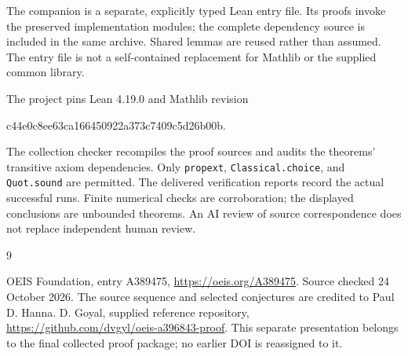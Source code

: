 \documentclass[11pt,a4paper]{article}
\theoremstyle{remark}
\begin{document}
The companion is a separate, explicitly typed Lean entry file. Its proofs
invoke the preserved implementation modules; the complete dependency source
is included in the same archive. Shared lemmas are reused rather than
assumed. The entry file is not a self-contained replacement for Mathlib or
the supplied common library.

The project pins Lean 4.19.0 and Mathlib revision
\begin{center}\small\ttfamily
c44e0c8ee63ca166450922a373c7409c5d26b00b.
\end{center}
The collection checker recompiles the proof sources and audits the
theorems' transitive axiom dependencies. Only \texttt{propext},
\texttt{Classical.choice}, and \texttt{Quot.sound} are permitted.
The delivered verification reports record the actual successful runs.
Finite numerical checks are corroboration; the displayed conclusions are
unbounded theorems. An AI review of source correspondence does not replace
independent human review.
\begin{thebibliography}{9}
\raggedright
{} OEIS Foundation, entry A389475,
\url{https://oeis.org/A389475}. Source checked 24 October 2026.
The source sequence and selected conjectures are credited to Paul D. Hanna.
 D. Goyal, supplied reference repository,
\url{https://github.com/dvgyl/oeis-a396843-proof}.
This separate presentation belongs to the final collected proof package;
no earlier DOI is reassigned to it.
\end{thebibliography}
\end{document}
